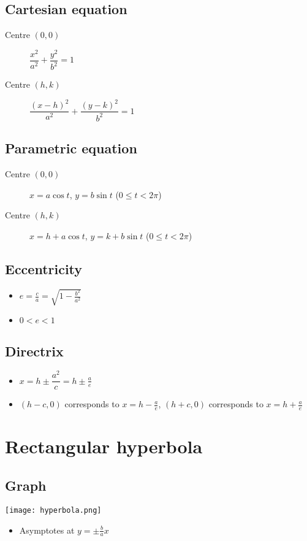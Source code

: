 \subsection{Cartesian equation}
\begin{description}
    \item[Centre $(0,0)$] $\dfrac{x^2}{a^2}+\dfrac{y^2}{b^2}=1$
    \item[Centre $(h,k)$] $\dfrac{(x-h)^2}{a^2}+\dfrac{(y-k)^2}{b^2}=1$
\end{description}
\subsection{Parametric equation}
\begin{description}
    \item[Centre $(0,0)$] $x=a\cos t$, $y=b\sin t$ ($0\leq t < 2\pi$)
    \item[Centre $(h,k)$] $x=h+a\cos t$, $y=k+b\sin t$ ($0\leq t < 2\pi$)
\end{description}
\subsection{Eccentricity}
\begin{itemize}
    \item $e=\frac{c}{a}=\sqrt{1-\frac{b^2}{a^2}}$
    \item $0<e<1$
\end{itemize}
\subsection{Directrix}
\begin{itemize}
    \item $x=h\pm \dfrac{a^2}{c} = h\pm\frac{a}{e}$
    \item $(h-c, 0)$ corresponds to $x=h-\frac{a}{e}$, $(h+c, 0)$ corresponds to $x=h+\frac{a}{e}$
\end{itemize}

\section{Rectangular hyperbola}
\subsection{Graph}
\texttt{[image: hyperbola.png]}
\begin{itemize}
    \item Asymptotes at $y=\pm \frac{b}{a}x$
\end{itemize}
